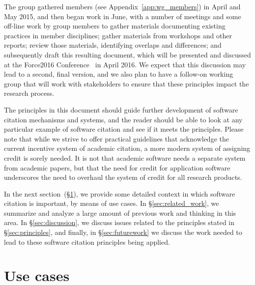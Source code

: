\documentclass[12pt, oneside]{amsart}
\begin{document}
The group gathered members (see Appendix~\ref{app:wg_members}) in April and May 2015,
and then began work in June, with a number of meetings
and some off-line work by group members to gather materials documenting existing
practices in member disciplines; gather materials from workshops and other reports;
review those materials, identifying overlaps and differences; and subsequently draft this resulting document,
which will be presented and discussed at the Force2016 Conference~\cite{force2016}
in April 2016.  We expect that this discussion may lead to a second, final version, and we also
plan to have a follow-on working group that will work with stakeholders to ensure that
these principles impact the research process.

The principles in this document should guide further development of software citation
mechanisms and systems, and the reader should be able to look at any particular example
of software citation and see if it meets the principles.
Please note that while we strive to offer practical guidelines that acknowledge the current incentive system of academic citation, a more modern system of assigning credit is sorely needed.
It is not that academic software needs a separate system from academic papers, but that the need for credit for application software underscores the need to overhaul the system of credit for all research products.

In the next section~(\S\ref{sec:use_cases}), we provide some detailed context in
which software citation is important, by means of use cases. In
\S\ref{sec:related_work}, we summarize and analyze a large amount of previous
work and thinking in this area. In \S\ref{sec:discussion}, we discuss issues
related to the principles stated in \S\ref{sec:principles}, and finally, in
\S\ref{sec:futurework} we discuss the work needed to lead to these
software citation principles being applied.

\section{Use cases}
\label{sec:use_cases}
\end{document}
